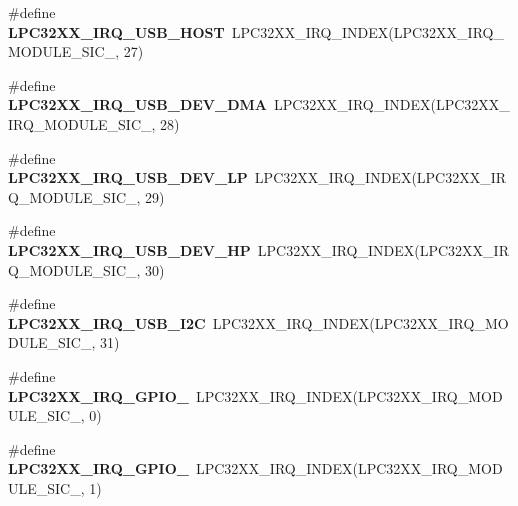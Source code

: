 \begin{DoxyCompactItemize}
\#define {\bfseries L\+P\+C32\+X\+X\+\_\+\+I\+R\+Q\+\_\+\+U\+S\+B\+\_\+\+H\+O\+ST}~L\+P\+C32\+X\+X\+\_\+\+I\+R\+Q\+\_\+\+I\+N\+D\+EX(L\+P\+C32\+X\+X\+\_\+\+I\+R\+Q\+\_\+\+M\+O\+D\+U\+L\+E\+\_\+\+S\+I\+C\+\_, 27)
\item 
\mbox{\label{group__lpc32xx__interrupt_gae74de8e13e7e9d3c0ce521570fbb95ae}} 
\#define {\bfseries L\+P\+C32\+X\+X\+\_\+\+I\+R\+Q\+\_\+\+U\+S\+B\+\_\+\+D\+E\+V\+\_\+\+D\+MA}~L\+P\+C32\+X\+X\+\_\+\+I\+R\+Q\+\_\+\+I\+N\+D\+EX(L\+P\+C32\+X\+X\+\_\+\+I\+R\+Q\+\_\+\+M\+O\+D\+U\+L\+E\+\_\+\+S\+I\+C\+\_, 28)
\item 
\mbox{\label{group__lpc32xx__interrupt_gacb3913ce6ab26f1547dd51dcbce4ce6c}} 
\#define {\bfseries L\+P\+C32\+X\+X\+\_\+\+I\+R\+Q\+\_\+\+U\+S\+B\+\_\+\+D\+E\+V\+\_\+\+LP}~L\+P\+C32\+X\+X\+\_\+\+I\+R\+Q\+\_\+\+I\+N\+D\+EX(L\+P\+C32\+X\+X\+\_\+\+I\+R\+Q\+\_\+\+M\+O\+D\+U\+L\+E\+\_\+\+S\+I\+C\+\_, 29)
\item 
\mbox{\label{group__lpc32xx__interrupt_ga0452f2c8d02f4a39dc2a589ce326b659}} 
\#define {\bfseries L\+P\+C32\+X\+X\+\_\+\+I\+R\+Q\+\_\+\+U\+S\+B\+\_\+\+D\+E\+V\+\_\+\+HP}~L\+P\+C32\+X\+X\+\_\+\+I\+R\+Q\+\_\+\+I\+N\+D\+EX(L\+P\+C32\+X\+X\+\_\+\+I\+R\+Q\+\_\+\+M\+O\+D\+U\+L\+E\+\_\+\+S\+I\+C\+\_, 30)
\item 
\mbox{\label{group__lpc32xx__interrupt_gaa98348620144edcde1fe12716330e2f9}} 
\#define {\bfseries L\+P\+C32\+X\+X\+\_\+\+I\+R\+Q\+\_\+\+U\+S\+B\+\_\+\+I2C}~L\+P\+C32\+X\+X\+\_\+\+I\+R\+Q\+\_\+\+I\+N\+D\+EX(L\+P\+C32\+X\+X\+\_\+\+I\+R\+Q\+\_\+\+M\+O\+D\+U\+L\+E\+\_\+\+S\+I\+C\+\_, 31)
\item 
\mbox{\label{group__lpc32xx__interrupt_gaebaa86eb14b40008923d391b537c66c1}} 
\#define {\bfseries L\+P\+C32\+X\+X\+\_\+\+I\+R\+Q\+\_\+\+G\+P\+I\+O\+\_}~L\+P\+C32\+X\+X\+\_\+\+I\+R\+Q\+\_\+\+I\+N\+D\+EX(L\+P\+C32\+X\+X\+\_\+\+I\+R\+Q\+\_\+\+M\+O\+D\+U\+L\+E\+\_\+\+S\+I\+C\+\_, 0)
\item 
\mbox{\label{group__lpc32xx__interrupt_gae45fb9bb21a3869e7fee19c30fa4a6df}} 
\#define {\bfseries L\+P\+C32\+X\+X\+\_\+\+I\+R\+Q\+\_\+\+G\+P\+I\+O\+\_}~L\+P\+C32\+X\+X\+\_\+\+I\+R\+Q\+\_\+\+I\+N\+D\+EX(L\+P\+C32\+X\+X\+\_\+\+I\+R\+Q\+\_\+\+M\+O\+D\+U\+L\+E\+\_\+\+S\+I\+C\+\_, 1)

\end{DoxyCompactItemize}
